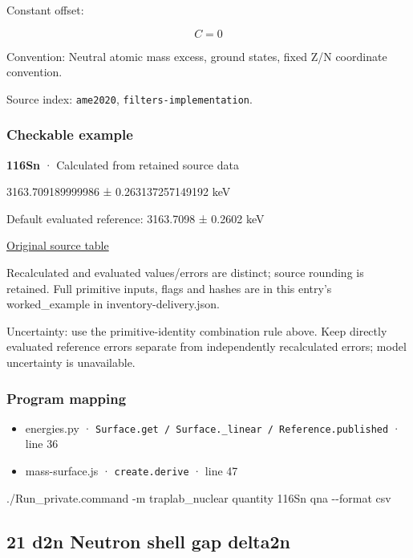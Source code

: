 \documentclass[
  11pt,
  letterpaper,
]{article}
\newenvironment{Shaded}{}{}
\newcommand{\AttributeTok}[1]{\textcolor[rgb]{0.49,0.56,0.16}{#1}}
\newcommand{\ExtensionTok}[1]{#1}
\newcommand{\NormalTok}[1]{#1}
\providecommand{\tightlist}{%
  \setlength{\itemsep}{0pt}\setlength{\parskip}{0pt}}
\begin{document}
Constant offset:

\[
C=0
\]

Convention: Neutral atomic mass excess, ground states, fixed Z/N
coordinate convention.

Source index: \texttt{ame2020}, \texttt{filters-implementation}.

\subsubsection{Checkable example}\label{checkable-example-19}

\textbf{116Sn} · Calculated from retained source data

3163.709189999986 ± 0.263137257149192 keV

Default evaluated reference: 3163.7098 ± 0.2602 keV

\href{https://www-nds.iaea.org/amdc/ame2020/rct2_1.mas20.txt}{Original
source table}

Recalculated and evaluated values/errors are distinct; source rounding
is retained. Full primitive inputs, flags and hashes are in this entry's
worked\_example in inventory-delivery.json.

Uncertainty: use the primitive-identity combination rule above. Keep
directly evaluated reference errors separate from independently
recalculated errors; model uncertainty is unavailable.

\subsubsection{Program mapping}\label{program-mapping-19}

\begin{itemize}
\tightlist
\item
  energies.py ·
  \texttt{Surface.get\ /\ Surface.\_linear\ /\ Reference.published} ·
  line 36
\item
  mass-surface.js · \texttt{create.derive} · line 47
\end{itemize}

\begin{Shaded}
\begin{Highlighting}[]
\ExtensionTok{./Run\_private.command} \AttributeTok{{-}m}\NormalTok{ traplab\_nuclear quantity 116Sn qna }\AttributeTok{{-}{-}format}\NormalTok{ csv}
\end{Highlighting}
\end{Shaded}

\subsection{21 d2n Neutron shell gap
delta2n}\label{d2n-neutron-shell-gap-delta2n}
\end{document}
